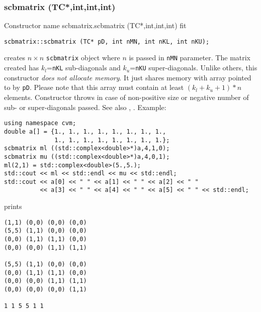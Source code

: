 \subsubsection{scbmatrix (TC*,int,int,int)}
Constructor%
\pdfdest name {scbmatrix.scbmatrix (TC*,int,int,int)} fit
\begin{verbatim}
scbmatrix::scbmatrix (TC* pD, int nMN, int nKL, int nKU);
\end{verbatim}
creates  $n\times n$ \verb"scbmatrix" object where $n$ is passed in
\verb"nMN" parameter. The matrix created has $k_l$=\verb"nKL" 
sub-diagonals and $k_u$=\verb"nKU" super-diagonals.
Unlike others, this constructor \textit{does not allocate  memory}.
It just shares  memory with  array pointed to by \verb"pD".
Please note that this array must contain at least $(k_l + k_u + 1)*n$ elements.
Constructor throws  
in case of non-positive size or negative number of sub- or super-diagonals 
passed.
See also ,
.
Example:
\begin{Verbatim}
using namespace cvm;
double a[] = {1., 1., 1., 1., 1., 1., 1., 1., 
              1., 1., 1., 1., 1., 1., 1., 1.};
scbmatrix ml ((std::complex<double>*)a,4,1,0);
scbmatrix mu ((std::complex<double>*)a,4,0,1);
ml(2,1) = std::complex<double>(5.,5.);
std::cout << ml << std::endl << mu << std::endl;
std::cout << a[0] << " " << a[1] << " " << a[2] << " "
          << a[3] << " " << a[4] << " " << a[5] << " " << std::endl;
\end{Verbatim}
prints
\begin{Verbatim}
(1,1) (0,0) (0,0) (0,0)
(5,5) (1,1) (0,0) (0,0)
(0,0) (1,1) (1,1) (0,0)
(0,0) (0,0) (1,1) (1,1)

(5,5) (1,1) (0,0) (0,0)
(0,0) (1,1) (1,1) (0,0)
(0,0) (0,0) (1,1) (1,1)
(0,0) (0,0) (0,0) (1,1)

1 1 5 5 1 1
\end{Verbatim}
\newpage


